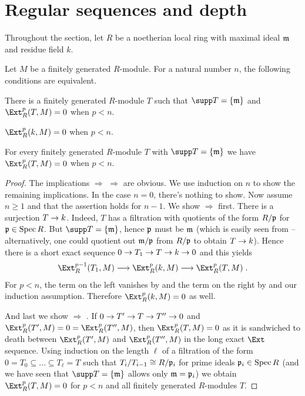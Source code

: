 \documentclass[a4paper,parskip=half,numbers=enddot, DIV=12]{scrreprt}
\renewcommand{\geq}{\geqslant}
\begin{document}
\section{Regular sequences and depth}
Throughout the section, let $R$ be a noetherian local ring with maximal ideal $\mathfrak{m}$ and residue field $k$.
\begin{prop}
	Let $M$ be a finitely generated $R$-module. For a natural number $n$, the following conditions are equivalent.
	\begin{alphanumerate}
		\item There is a finitely generated $R$-module $T$ such that $\supp T=\{\mm\}$ and $\Ext_R^p(T,M)=0$ when $p<n$.
		\item $\Ext_R^p(k,M)=0$ when $p<n$.
		\item For every finitely generated $R$-module $T$ with $\supp T=\{\mm\}$ we have $\Ext_R^p(T,M)=0$ when $p<n$.
	\end{alphanumerate}
\end{prop}
\begin{proof}
	The implications  $\Rightarrow$  $\Rightarrow$  are obvious. We use induction on $n$ to show the remaining implications. In the case $n=0$, there's nothing to show. Now assume $n\geq 1$ and that the assertion holds for $n-1$. We show  $\Rightarrow$  first. There is a surjection $T\morphism k$. Indeed, $T$ has a filtration with quotients of the form $R/\mathfrak{p}$ for $\mathfrak{p}\in\operatorname{Spec} R$. But $\supp T=\{\mm\}$, hence $\mathfrak{p}$ must be $\mathfrak{m}$ (which is easily seen from \cite[Fact~3.1.2 and Lemma~3.4.1]{alg2} -- alternatively, one could quotient out $\mathfrak{m}/\mathfrak{p}$ from $R/\mathfrak{p}$ to obtain $T\morphism k$). Hence there is a short exact sequence $0\morphism T_1\morphism T\morphism k\morphism 0$ and this yields
	\begin{align*}
		\Ext_R^{p-1}(T_1,M)\morphism\Ext_R^p(k,M)\morphism\Ext_R^p(T,M)\;.
	\end{align*}
	For $p<n$, the term on the left vanishes by  and the term on the right by  and our induction assumption. Therefore $\Ext_R^p(k,M)=0$ as well.
	
	And last we show  $\Rightarrow$ . If $0\morphism T'\morphism T\morphism T''\morphism 0$ and $\Ext_R^p(T',M)=0=\Ext_R^p(T'',M)$, then $\Ext_R^p(T,M)=0$ as it is sandwiched to death between $\Ext_R^p(T',M)$ and $\Ext_R^p(T'',M)$ in the long exact $\Ext$ sequence. Using induction on the length $\ell$ of a filtration of the form $0=T_0\subseteq\ldots\subseteq T_\ell=T$ such that $T_i/T_{i-1}\cong R/\mathfrak{p}_i$ for prime ideals $\mathfrak{p}_i\in\operatorname{Spec} R$ (and we have seen that $\supp T=\{\mm\}$ allows only $\mathfrak{m}=\mathfrak{p}_i$) we obtain $\Ext_R^p(T,M)=0$ for $p<n$ and all finitely generated $R$-modules $T$.
\end{proof}
\end{document}
